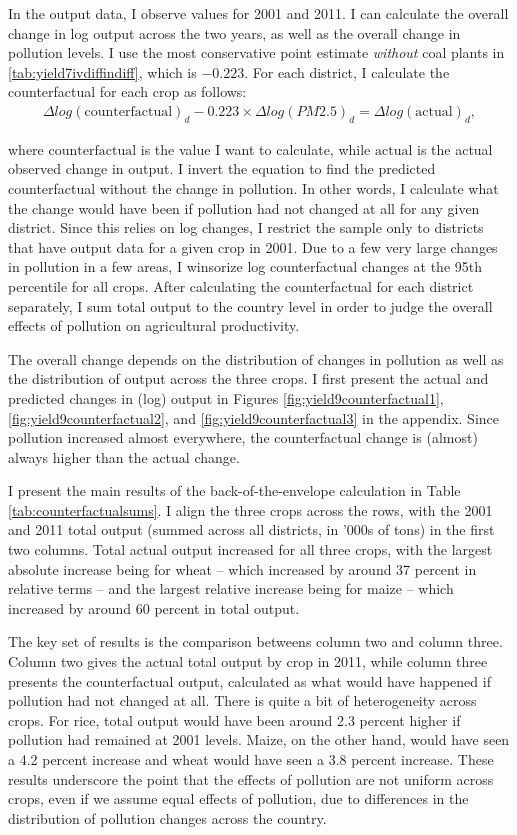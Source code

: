 \documentclass[
]{article}
\begin{document}
In the output data, I observe values for 2001 and 2011. I can calculate the overall change in log output across the two years, as well as the overall change in pollution levels. I use the most conservative point estimate \emph{without} coal plants in \ref{tab:yield7ivdiffindiff}, which is \(-0.223\). For each district, I calculate the counterfactual for each crop as follows:
\begin{gather} \label{eq:counterfactual} \Delta log(\mathrm{counterfactual})_{d}-0.223\times\Delta log(PM2.5)_{d} = \Delta log(\mathrm{actual})_{d}, \end{gather}

where \(\mathrm{counterfactual}\) is the value I want to calculate, while \(\mathrm{actual}\) is the actual observed change in output. I invert the equation to find the predicted counterfactual without the change in pollution. In other words, I calculate what the change would have been if pollution had not changed at all for any given district. Since this relies on log changes, I restrict the sample only to districts that have output data for a given crop in 2001. Due to a few very large changes in pollution in a few areas, I winsorize log counterfactual changes at the 95th percentile for all crops. After calculating the counterfactual for each district separately, I sum total output to the country level in order to judge the overall effects of pollution on agricultural productivity.

The overall change depends on the distribution of changes in pollution as well as the distribution of output across the three crops. I first present the actual and predicted changes in (log) output in Figures \ref{fig:yield9counterfactual1}, \ref{fig:yield9counterfactual2}, and \ref{fig:yield9counterfactual3} in the appendix. Since pollution increased almost everywhere, the counterfactual change is (almost) always higher than the actual change.

I present the main results of the back-of-the-envelope calculation in Table \ref{tab:counterfactualsums}. I align the three crops across the rows, with the 2001 and 2011 total output (summed across all districts, in '000s of tons) in the first two columns. Total actual output increased for all three crops, with the largest absolute increase being for wheat -- which increased by around 37 percent in relative terms -- and the largest relative increase being for maize -- which increased by around 60 percent in total output.

The key set of results is the comparison betweens column two and column three. Column two gives the actual total output by crop in 2011, while column three presents the counterfactual output, calculated as what would have happened if pollution had not changed at all. There is quite a bit of heterogeneity across crops. For rice, total output would have been around 2.3 percent higher if pollution had remained at 2001 levels. Maize, on the other hand, would have seen a 4.2 percent increase and wheat would have seen a 3.8 percent increase. These results underscore the point that the effects of pollution are not uniform across crops, even if we assume equal effects of pollution, due to differences in the distribution of pollution changes across the country.
\end{document}
